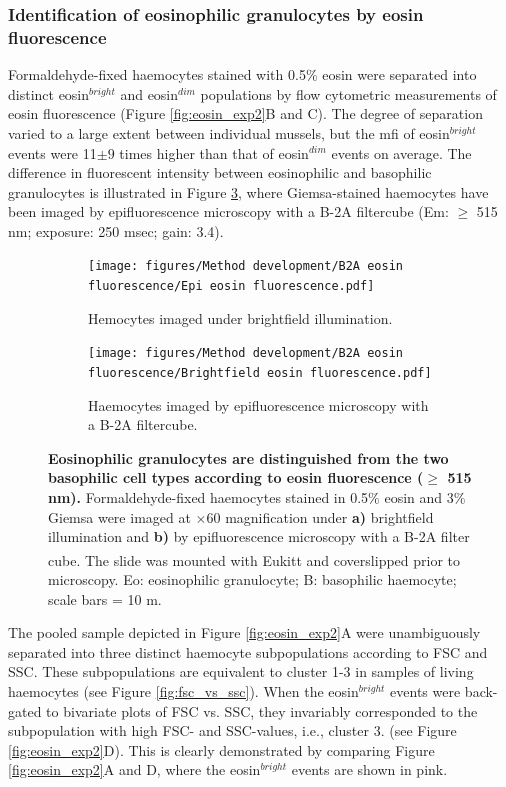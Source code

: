 \subsubsection{Identification of eosinophilic granulocytes by eosin fluorescence}
Formaldehyde-fixed haemocytes stained with 0.5\% eosin were separated into distinct eosin$^{bright}$ and eosin$^{dim}$ populations by flow cytometric measurements of eosin fluorescence (Figure \ref{fig:eosin_exp2}B and C). The degree of separation varied to a large extent between individual mussels, but the \acrshort{mfi} of eosin$^{bright}$ events were 11$\pm{9}$ times higher than that of eosin$^{dim}$ events on average. The difference in fluorescent intensity between eosinophilic and basophilic granulocytes is illustrated in Figure \ref{fig:Eosin_fluorescence_B2A}, where Giemsa-stained haemocytes have been imaged by epifluorescence microscopy with a B-2A filtercube (Em: $\geq$ 515 nm; exposure: 250 msec; gain: 3.4).

\begin{figure}[H]
    \centering
    \begin{subfigure}[b]{.45\textwidth}
        \centering
        \texttt{[image: figures/Method development/B2A eosin fluorescence/Epi eosin fluorescence.pdf]}
        \caption{Hemocytes imaged under brightfield illumination.}
        \label{ffig:a}
    \end{subfigure}
    \hfill
    \begin{subfigure}[b]{.45\textwidth}
        \centering
        \texttt{[image: figures/Method development/B2A eosin fluorescence/Brightfield eosin fluorescence.pdf]}
        \caption{Haemocytes imaged by epifluorescence microscopy with a B-2A filtercube.}
        \label{ffig:b}
    \end{subfigure}
    \caption{\textbf{Eosinophilic granulocytes are distinguished from the two basophilic cell types according to eosin fluorescence ($\geq$ 515 nm).} Formaldehyde-fixed haemocytes stained in 0.5\% eosin and 3\% Giemsa were imaged at $\times$60 magnification under \textbf{a)} brightfield illumination and \textbf{b)} by epifluorescence microscopy with a B-2A filter cube. The slide was mounted with Eukitt\textsuperscript{\textregistered} and coverslipped prior to microscopy. Eo: eosinophilic granulocyte; B: basophilic haemocyte; scale bars = 10 \micro m. }
    \label{fig:Eosin_fluorescence_B2A}
\end{figure}

The pooled sample depicted in Figure \ref{fig:eosin_exp2}A were unambiguously separated into three distinct haemocyte subpopulations according to FSC and SSC. These subpopulations are equivalent to cluster 1-3 in samples of living haemocytes (see Figure \ref{fig:fsc_vs_ssc}). When the eosin$^{bright}$ events were back-gated to bivariate plots of FSC vs. SSC, they invariably corresponded to the subpopulation with high FSC- and SSC-values, i.e., cluster 3. (see Figure \ref{fig:eosin_exp2}D). This is clearly demonstrated by comparing Figure \ref{fig:eosin_exp2}A and D, where the eosin$^{bright}$ events are shown in pink.

